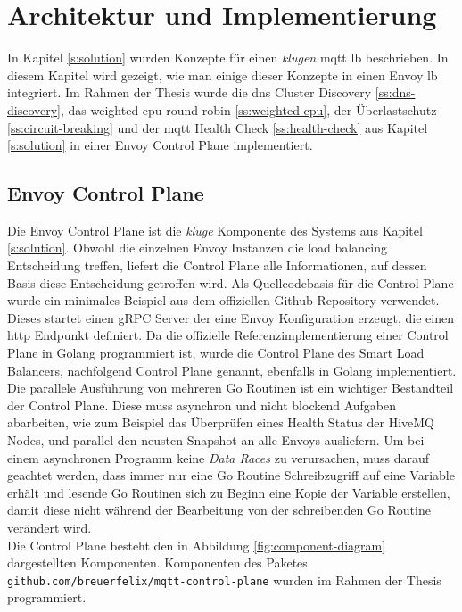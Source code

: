 \section{Architektur und Implementierung}
In Kapitel \ref{s:solution} wurden Konzepte für einen \textit{klugen} \ac{mqtt} \acl{lb} beschrieben. In diesem Kapitel wird gezeigt, wie man einige dieser Konzepte in einen Envoy \acl{lb} integriert.
Im Rahmen der Thesis wurde die \ac{dns} Cluster Discovery \ref{ss:dns-discovery}, das weighted \ac{cpu} round-robin \ref{ss:weighted-cpu}, der Überlastschutz \ref{ss:circuit-breaking} und der \ac{mqtt} Health Check \ref{ss:health-check} aus Kapitel \ref{s:solution} in einer Envoy Control Plane implementiert.

\subsection{Envoy Control Plane} \label{si:control-plane}
Die Envoy Control Plane ist die \textit{kluge} Komponente des Systems aus Kapitel \ref{s:solution}. Obwohl die einzelnen Envoy Instanzen die load balancing Entscheidung treffen, liefert die Control Plane alle Informationen, auf dessen Basis diese Entscheidung getroffen wird.
Als Quellcodebasis für die Control Plane wurde ein minimales Beispiel aus dem offiziellen Github Repository \cite{EnvoyproxyGocontrolplane} verwendet. Dieses startet einen gRPC Server der eine Envoy Konfiguration erzeugt, die einen \ac{http} Endpunkt definiert. Da die offizielle Referenzimplementierung einer Control Plane in Golang programmiert ist, wurde die Control Plane des Smart Load Balancers, nachfolgend Control Plane genannt, ebenfalls in Golang implementiert.
\\
Die parallele Ausführung von mehreren Go Routinen ist ein wichtiger Bestandteil der Control Plane. Diese muss asynchron und nicht blockend Aufgaben abarbeiten, wie zum Beispiel das Überprüfen eines Health Status der HiveMQ Nodes, und parallel den neusten Snapshot an alle Envoys ausliefern.
Um bei einem asynchronen Programm keine \textit{Data Races} zu verursachen, muss darauf geachtet werden, dass immer nur eine Go Routine Schreibzugriff auf eine Variable erhält und lesende Go Routinen sich zu Beginn eine Kopie der Variable erstellen, damit diese nicht während der Bearbeitung von der schreibenden Go Routine verändert wird.
\\
Die Control Plane besteht den in Abbildung \ref{fig:component-diagram} dargestellten Komponenten. Komponenten des Paketes \verb|github.com/breuerfelix/mqtt-control-plane| wurden im Rahmen der Thesis programmiert.
